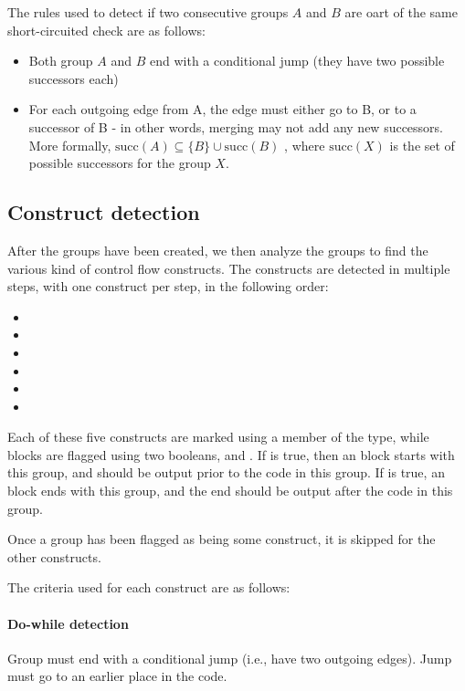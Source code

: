 The rules used to detect if two consecutive groups $A$ and $B$ are oart of the same short-circuited check are as follows:
\begin{itemize}
\item Both group $A$ and $B$ end with a conditional jump (they have two possible successors each)
\item For each outgoing edge from A, the edge must either go to B, or to a successor of B - in other words, merging may not add any new successors. More formally, $\text{succ}(A) \subseteq \{B\} \cup \text{succ}(B)$ , where $\text{succ}(X)$ is the set of possible successors for the group $X$.
\end{itemize}

\subsection{Construct detection}
After the groups have been created, we then analyze the groups to find the various kind of control flow constructs. The constructs are detected in multiple steps, with one construct per step, in the following order:
\begin{itemize}
\item {}
\item {}
\item {}
\item {}
\item {}
\item {}
\end{itemize}

Each of these five constructs are marked using a  member of the  type, while  blocks are flagged using two booleans,  and . If  is true, then an  block starts with this group, and should be output prior to the code in this group. If  is true, an  block ends with this group, and the end should be output after the code in this group.

Once a group has been flagged as being some construct, it is skipped for the other constructs.

The criteria used for each construct are as follows:

\paragraph{Do-while detection}
Group must end with a conditional jump (i.e., have two outgoing edges). Jump must go to an earlier place in the code.

